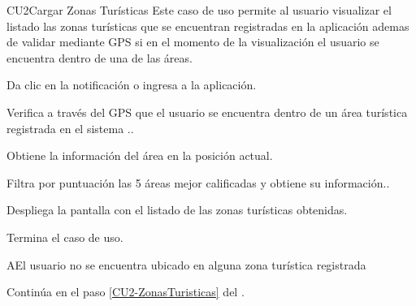
% 



	\begin{UseCase}{CU2}{Cargar Zonas Turísticas}{
		Este caso de uso permite al usuario visualizar el listado las zonas turísticas que se encuentran registradas en la aplicación ademas de validar mediante GPS si en el momento de la visualización el usuario se encuentra dentro de una de las áreas. 
	}
	\end{UseCase}
	\begin{UCtrayectoria} 
		\UCpaso[\UCactor] Da clic en la notificación o ingresa a la aplicación.
		
		\UCpaso Verifica a través del GPS que el usuario se encuentra dentro de un área turística registrada en el sistema ..
		
		\UCpaso Obtiene la información del área en la posición actual.
		
		\UCpaso Filtra por puntuación las 5 áreas mejor calificadas y obtiene su información.\label{CU2-ZonasTuristicas}.
		
		\UCpaso Despliega la pantalla  con el listado de las zonas turísticas obtenidas.

		\UCpaso[] Termina el caso de uso.
		
	\end{UCtrayectoria}

		\begin{UCtrayectoriaA}{A}{El usuario no se encuentra ubicado en alguna zona turística registrada}
			
			\UCpaso Continúa en el paso \ref{CU2-ZonasTuristicas} del .
			
		\end{UCtrayectoriaA}
	
	